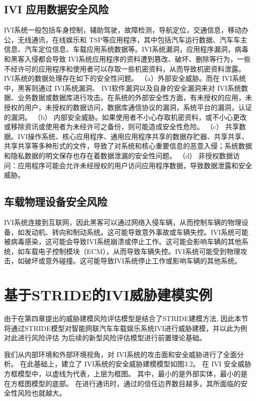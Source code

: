 \subsection{IVI 应用数据安全风险}

IVI系统一般包括车身控制，辅助驾驶，故障检测，导航定位，交通信息，移动办公，无线通讯，在线娱乐和 TSP等应用程序，其中包括汽车运行数据、汽车车主信息、汽车定位信息、车载应用系统数据等。IVI系统漏洞，应用程序漏洞，病毒和黑客入侵都会导致 IVI系统应用程序的资料遭到篡改、破坏、删除等行为，一些不经许可的应用程序和使用者可以存取一些机密资料，从而导致机密资料泄露。IVI系统的数据处理存在如下的安全性问题。
（a）外部安全威胁。而在 IVI系统中，黑客则通过 IVI系统漏洞、 IVI软件漏洞以及自身的安全漏洞来对 IVI系统数据、业务数据或数据库进行攻击。在系统的外部安全性方面，有未授权的应用，未授权的用户，未授权的数据访问，数据库通信协议的漏洞，系统平台的漏洞，认证的漏洞。 
（b） 内部安全威胁。如果使用者不小心存取机密资料，或不小心更改或移除资讯或使用者为未经许可之备份，则可能造成安全性危险。
（c） 共享数据。IVI操作系统、核心应用程序、通用应用程序共享的数据存贮器、共享共享、共享共享等多种形式的文件，导致了对系统和核心重要信息的恶意入侵；系统数据和隐私数据的明文保存也存在着数据泄漏的安全性问题。
（d） 非授权数据访问：应用程序可能会允许未经授权的用户访问应用程序数据，导致数据泄露和安全威胁。 

\subsection{车载物理设备安全风险}

IVI系统连接到互联网，因此黑客可以通过网络入侵车辆，从而控制车辆的物理设备，如发动机、转向和制动系统。这可能导致意外事故或车辆失控。IVI系统可能被病毒感染，这可能会导致IVI系统崩溃或停止工作。这可能会影响车辆的其他系统，如车载电子控制模块（ECM），从而导致车辆失控。IVI系统可能受到物理攻击，如破坏或意外碰撞。这可能导致IVI系统停止工作或影响车辆的其他系统。

\section{基于STRIDE的IVI威胁建模实例}
由于在第四章提出的威胁建模风险评估模型是结合了STRIDE建模方法, 因此本节将通过STRIDE模型对智能网联汽车车载娱乐系统IVI进行威胁建模，并以此为例对此进行风险评估
为后续的新型风险评估模型进行前置理论基础。

我们从内部环境和外部环境视角，对 IVI系统的攻击面和安全威胁进行了全面分析。
在此基础上，建立了 IVI系统的安全威胁建模模型如图3.2。
在 IVI 安全威胁方框模型中，以虚线为代表，上层为框图。
其中，最小的是外部实体，最小的是在方框图模型的底部。
在进行通讯时，通过的信任边界数目越多，其所面临的安全性风险也就越大。

